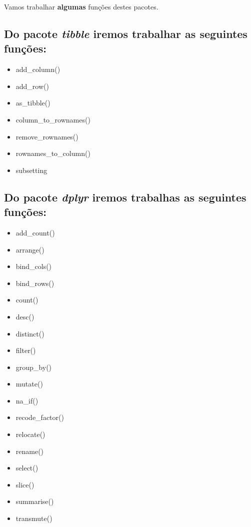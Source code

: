\documentclass[]{book}
\providecommand{\tightlist}{%
  \setlength{\itemsep}{0pt}\setlength{\parskip}{0pt}}
\begin{document}
Vamos trabalhar \textbf{algumas} funções destes pacotes.

\hypertarget{do-pacote-tibble-iremos-trabalhar-as-seguintes-funuxe7uxf5es}{%
\subsection{\texorpdfstring{Do pacote \emph{tibble} iremos trabalhar as seguintes funções:}{Do pacote tibble iremos trabalhar as seguintes funções:}}\label{do-pacote-tibble-iremos-trabalhar-as-seguintes-funuxe7uxf5es}}

\begin{itemize}
\tightlist
\item
  add\_column()
\item
  add\_row()
\item
  as\_tibble()
\item
  column\_to\_rownames()
\item
  remove\_rownames()
\item
  rownames\_to\_column()
\item
  subsetting
\end{itemize}

\hypertarget{do-pacote-dplyr-iremos-trabalhas-as-seguintes-funuxe7uxf5es}{%
\subsection{\texorpdfstring{Do pacote \emph{dplyr} iremos trabalhas as seguintes funções:}{Do pacote dplyr iremos trabalhas as seguintes funções:}}\label{do-pacote-dplyr-iremos-trabalhas-as-seguintes-funuxe7uxf5es}}

\begin{itemize}
\tightlist
\item
  add\_count()
\item
  arrange()
\item
  bind\_cols()
\item
  bind\_rows()
\item
  count()
\item
  desc()
\item
  distinct()
\item
  filter()
\item
  group\_by()
\item
  mutate()
\item
  na\_if()
\item
  recode\_factor()
\item
  relocate()
\item
  rename()
\item
  select()
\item
  slice()
\item
  summarise()
\item
  transmute()
\end{itemize}
\end{document}

